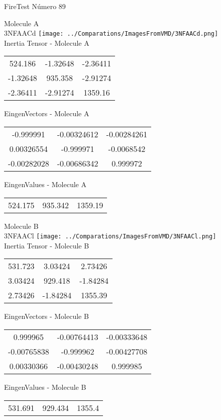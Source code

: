 \vtab[-2cm]
\begin{center}
{\large FireTest \tab Número 89}
\end{center}
\begin{multicols}{2}
\begin{center}

Molecule A \\ 
3NFAACd
\texttt{[image: ../Comparations/ImagesFromVMD/3NFAACd.png]}
\\
Inertia Tensor - Molecule A \\
\vtab

\begin{tabular}{|c c c|}
524.186	 & 	-1.32648	 & 	-2.36411	 \\
-1.32648	 & 	935.358	 & 	-2.91274	 \\
-2.36411	 & 	-2.91274	 & 	1359.16
\end{tabular}

\vtab
 EingenVectors - Molecule A     \\
\vtab
\begin{tabular}{|c c c|}
-0.999991	 & 	-0.00324612	 & 	-0.00284261	 \\
0.00326554	 & 	-0.999971	 & 	-0.0068542	 \\
-0.00282028	 & 	-0.00686342	 & 	0.999972
\end{tabular}

\vtab
 EingenValues - Molecule A     \\
\vtab
\begin{tabular}{|c c c|}
524.175	 & 	935.342	 & 	1359.19	 \\
\end{tabular}
\columnbreak

Molecule B \\ 
3NFAACl
\texttt{[image: ../Comparations/ImagesFromVMD/3NFAACl.png]}
\\
Inertia Tensor - Molecule B \\
\vtab

\begin{tabular}{|c c c|}
531.723	 & 	3.03424	 & 	2.73426	 \\
3.03424	 & 	929.418	 & 	-1.84284	 \\
2.73426	 & 	-1.84284	 & 	1355.39
\end{tabular}

\vtab
 EingenVectors - Molecule B     \\
\vtab
\begin{tabular}{|c c c|}
0.999965	 & 	-0.00764413	 & 	-0.00333648	 \\
-0.00765838	 & 	-0.999962	 & 	-0.00427708	 \\
0.00330366	 & 	-0.00430248	 & 	0.999985
\end{tabular}

\vtab
 EingenValues - Molecule B     \\
\vtab
\begin{tabular}{|c c c|}
531.691	 & 	929.434	 & 	1355.4	 \\
\end{tabular}

\end{center}
\end{multicols}
